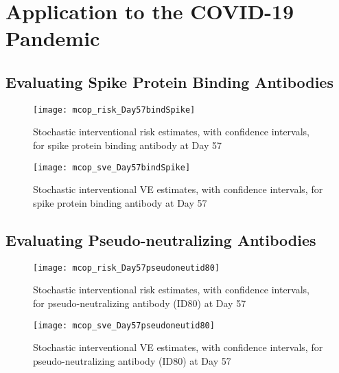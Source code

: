\section{Application to the COVID-19 Pandemic}

\subsection{Evaluating Spike Protein Binding Antibodies}\label{spba-day57}

\begin{figure}[H]
  \centering
  \texttt{[image: mcop\_risk\_Day57bindSpike]}
  \caption{Stochastic interventional risk estimates, with confidence intervals,
  for spike protein binding antibody at Day 57}
  \label{fig:marker1-risk-day57}
\end{figure}

\begin{figure}[H]
  \centering
  \texttt{[image: mcop\_sve\_Day57bindSpike]}
  \caption{Stochastic interventional VE estimates, with confidence intervals,
    for spike protein binding antibody at Day 57}
  \label{fig:marker1-sve-day57}
\end{figure}

\subsection{Evaluating Pseudo-neutralizing Antibodies}\label{psna-day57}

\begin{figure}[H]
  \centering
  \texttt{[image: mcop\_risk\_Day57pseudoneutid80]}
  \caption{Stochastic interventional risk estimates, with confidence intervals,
  for pseudo-neutralizing antibody (ID80) at Day 57}
  \label{fig:marker4-risk-day57}
\end{figure}

\begin{figure}[H]
  \centering
  \texttt{[image: mcop\_sve\_Day57pseudoneutid80]}
  \caption{Stochastic interventional VE estimates, with confidence intervals,
  for pseudo-neutralizing antibody (ID80) at Day 57}
  \label{fig:marker4-sve-day57}
\end{figure}
